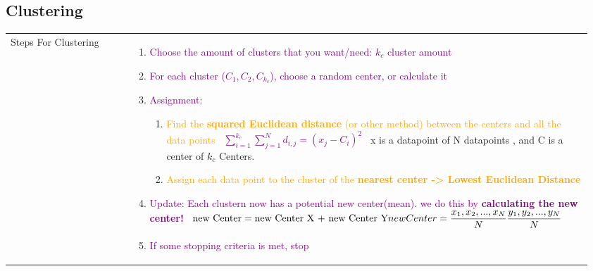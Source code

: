 \documentclass[main.tex,fontsize=8pt,paper=a4,paper=portrait,DIV=calc,]{scrartcl}
\begin{document}
\begin{table}[ht!]
\subsection{Clustering}
\begin{tabular}{|m{0.2\linewidth}|m{0.755\linewidth}|}
\hline
Steps For Clustering &
\vspace{2mm}
\begin{enumerate}
\item \textcolor{purple}{Choose the amount of clusters that you want/need: \(k_c\) cluster amount}
\item \textcolor{purple}{For each cluster (\(C_1, C_2, C_{k_c}\)), choose a random center, or calculate it }\newline
\item \textcolor{purple}{Assignment:}\newline
  \begin{enumerate}
  \item \textcolor{orange}{Find the \textbf{squared Euclidean distance} (or other method) between the centers and all the data points}\newline
    \, \newline
    \large  \textcolor{purple}{\(\sum_{i=1}^{k_c} \sum_{j=1}^{N} d_{i,j} = (x_j - C_i)^2\)}\newline
    \normalsize \, \newline
    x is a datapoint of N datapoints , and C is a center of \(k_c\) Centers.\newline
  \item \textcolor{orange}{Assign each data point to the cluster of the \textbf{nearest center -> Lowest Euclidean Distance}}
  \end{enumerate} 
\item \textcolor{purple}{Update: Each clustern now has a potential new center(mean). we do this by \textbf{calculating the new center!}}\newline
  \, \newline
  \large \textcolor{purple}{\( \text{new Center} = \text{new Center X + new Center Y}\newline
    \, \newline
  new Center = \dfrac{x_1, x_2 , \text{...}, x_{N}}{N} \dfrac{y_1, y_2 , \text{...}, y_{N}}{N} \)}\newline
  \normalsize \, \newline
\item \textcolor{purple}{If some stopping criteria is met, stop}\newline

\end{enumerate}
\end{tabular}
\end{table}
\end{document}

